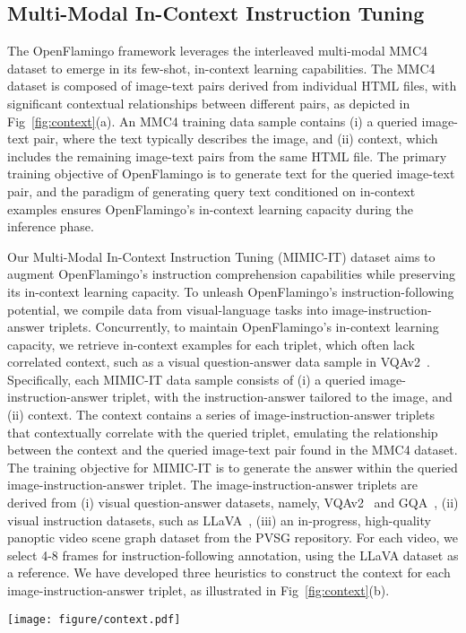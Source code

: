 \documentclass{article}
\begin{document}
\subsection{Multi-Modal In-Context Instruction Tuning}
\label{sec:ici}
The OpenFlamingo framework leverages the interleaved multi-modal MMC4 dataset to emerge in its few-shot, in-context learning capabilities. The MMC4 dataset is composed of image-text pairs derived from individual HTML files, with significant contextual relationships between different pairs, as depicted in Fig~\ref{fig:context}(a). An MMC4 training data sample contains (i) a queried image-text pair, where the text typically describes the image, and (ii) context, which includes the remaining image-text pairs from the same HTML file. The primary training objective of OpenFlamingo is to generate text for the queried image-text pair, and the paradigm of generating query text conditioned on in-context examples ensures OpenFlamingo's in-context learning capacity during the inference phase.

Our Multi-Modal In-Context Instruction Tuning (MIMIC-IT) dataset aims to augment OpenFlamingo's instruction comprehension capabilities while preserving its in-context learning capacity. To unleash OpenFlamingo's instruction-following potential, we compile data from visual-language tasks into image-instruction-answer triplets. Concurrently, to maintain OpenFlamingo's in-context learning capacity, we retrieve in-context examples for each triplet, which often lack correlated context, such as a visual question-answer data sample in VQAv2~\cite{vqa}. Specifically, each MIMIC-IT data sample consists of (i) a queried image-instruction-answer triplet, with the instruction-answer tailored to the image, and (ii) context. The context contains a series of image-instruction-answer triplets that contextually correlate with the queried triplet, emulating the relationship between the context and the queried image-text pair found in the MMC4 dataset. The training objective for MIMIC-IT is to generate the answer within the queried image-instruction-answer triplet. The image-instruction-answer triplets are derived from (i) visual question-answer datasets, namely, VQAv2~\cite{vqa} and GQA~\cite{gqa}, (ii) visual instruction datasets, such as LLaVA~\cite{llava}, (iii) an in-progress, high-quality panoptic video scene graph dataset from the PVSG repository. For each video, we select 4-8 frames for instruction-following annotation, using the LLaVA dataset as a reference. We have developed three heuristics to construct the context for each image-instruction-answer triplet, as illustrated in Fig~\ref{fig:context}(b).
\begin{figure*}[tp]
    \centering
\texttt{[image: figure/context.pdf]}
\caption{\textbf{Illustration of example data formats in MMC4 and MIMIC-IT}. (a) The illustration of the data format in the MMC4 dataset that are used OpenFlamingo. (b) Three heuristics to build the multi-modal in-Context instruction tuning (MIMIC-IT) dataset.}
    \label{fig:context}
\end{figure*}
\end{document}
